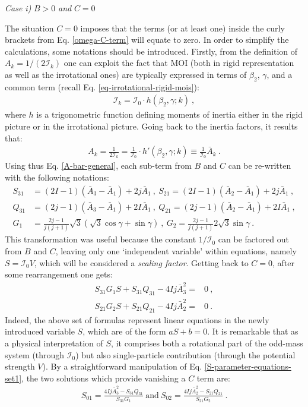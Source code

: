 \textit{Case i)} $B>0$ \textit{and} $C=0$

The situation $C=0$ imposes that the terms (or at least one) inside the curly brackets from Eq. \ref{omega-C-term} will equate to zero. In order to simplify the calculations, some notations should be introduced. Firstly, from the definition of $A_k=1/(2\mathcal{I}_k)$ one can exploit the fact that MOI (both in rigid representation as well as the irrotational ones) are typically expressed in terms of $\beta_2$, $\gamma$, and a common term (recall Eq. \ref{eq-irrotational-rigid-mois}):
\begin{align}
    \mathcal{I}_k=\mathcal{I}_0\cdot h(\beta_2,\gamma;k)\ ,
\end{align}
where $h$ is a trigonometric function defining moments of inertia either in the rigid picture or in the irrotational picture. Going back to the inertia factors, it results that:
\begin{align}
    A_k=\frac{1}{2\mathcal{I}_k}=\frac{1}{\mathcal{I}_0}\cdot h'(\beta_2,\gamma;k)\equiv\frac{1}{\mathcal{I}_0}\bar{A}_k\ .
    \label{A-bar-general}
\end{align}
Using thus Eq. \ref{A-bar-general}, each sub-term from $B$ and $C$ can be re-written with the following notations:
\begin{align}
    S_{31}&=(2I-1)(\bar{A}_3-\bar{A}_1)+2j\bar{A}_1\ ,\ S_{21}=(2I-1)(\bar{A}_2-\bar{A}_1)+2j\bar{A}_1\ , \nonumber\\
    Q_{31}&=(2j-1)(\bar{A}_3-\bar{A}_1)+2I\bar{A}_1\ ,\ Q_{21}=(2j-1)(\bar{A}_2-\bar{A}_1)+2I\bar{A}_1\ ,\nonumber\\
    G_1&=\frac{2j-1}{j(j+1)}\sqrt{3}\left(\sqrt{3}\cos\gamma+\sin\gamma\right)\ ,\ G_2=\frac{2j-1}{j(j+1)}2\sqrt{3}\sin\gamma\ .
\end{align}
This transformation was useful because the constant $1/\mathcal{I}_0$ can be factored out from $B$ and $C$, leaving only one `independent variable' within equations, namely $S=\mathcal{I}_0V$, which will be considered a \emph{scaling factor}. Getting back to $C=0$, after some rearrangement one gets:
\begin{align}
    S_{31}G_1S+S_{31}Q_{31}-4Ij\bar{A}_3^2=&0\ ,\nonumber\\
    S_{21}G_2S+S_{21}Q_{21}-4Ij\bar{A}_2^2=&0\ .
    \label{S-parameter-equations-set1}
\end{align}
Indeed, the above set of formulas represent linear equations in the newly introduced variable $S$, which are of the form $aS+b=0$. It is remarkable that as a physical interpretation of $S$, it comprises both a rotational part of the odd-mass system (through $\mathcal{I}_0$) but also single-particle contribution (through the potential strength $V$). By a straightforward manipulation of Eq. \ref{S-parameter-equations-set1}, the two solutions which provide vanishing a $C$ term are:
\begin{align}
    S_{01}=\frac{4Ij\bar{A}_3^2-S_{31}Q_{31}}{S_{31}G_1}\ \text{and}\ S_{02}=\frac{4Ij\bar{A}_2^2-S_{21}Q_{21}}{S_{21}G_2}\ .
\end{align}